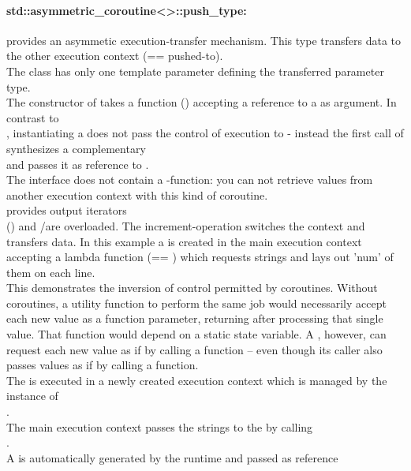 \paragraph*{std::asymmetric\_coroutine<>::push\_type:}
provides an asymmetic execution-transfer mechanism. This type transfers data to
the other execution context (== pushed-to).\\
The class has only one template parameter defining the transferred parameter
type.\\
The constructor of \pushcoro takes a function (\corofunction) accepting a
reference to a \pullcoro as argument. In contrast to\\
\pullcoro, instantiating a \pushcoro does not pass the control of execution to
\corofunction{ }- instead the first call of\\
\pushcoroop synthesizes a complementary\\
\pullcoro and passes it as reference to \corofunction.\\
\newline
The interface does not contain a \get-function: you can not retrieve values from
another execution context with this kind of coroutine.\\
\newline
\pushcoro provides output iterators\\
(\pushcoroiterator) and \bgin/\ed are overloaded. The increment-operation
switches the context and transfers data.
In this example a \pushcoro is created in the main execution context accepting
a lambda function (== \corofunction) which requests strings and lays out 'num'
of them on each line.\\
This demonstrates the inversion of control permitted by coroutines. Without
coroutines, a utility function to perform the same job would necessarily
accept each new value as a function parameter, returning after processing that
single value. That function would depend on a static state variable. A
\corofunction, however, can request each new value as if by calling a function
-- even though its caller also passes values as if by calling a function.\\
The \corofunction is executed in a newly created execution context which is
managed by the instance of\\
\pushcoro.\\
The main execution context passes the strings to the
\corofunction by calling\\
\pushcoroop.\\
A \pullcoro is automatically generated by the runtime and passed as reference
